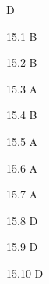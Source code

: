 \begin{Solution}{15}
D
\end{Solution}
\begin{Solution}{15.{1}}
B
\end{Solution}
\begin{Solution}{15.{2}}
B
\end{Solution}
\begin{Solution}{15.{3}}
A
\end{Solution}
\begin{Solution}{15.{4}}
B
\end{Solution}
\begin{Solution}{15.{5}}
A
\end{Solution}
\begin{Solution}{15.{6}}
A
\end{Solution}
\begin{Solution}{15.{7}}
A
\end{Solution}
\begin{Solution}{15.{8}}
D
\end{Solution}
\begin{Solution}{15.{9}}
D
\end{Solution}
\begin{Solution}{15.{10}}
D
\end{Solution}
